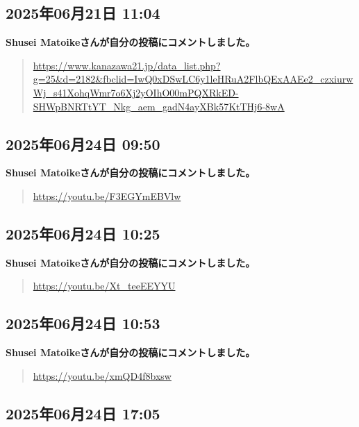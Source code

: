 \subsection*{2025年06月21日 11:04}

\textbf{Shusei Matoikeさんが自分の投稿にコメントしました。}

\begin{quote}
\url{https://www.kanazawa21.jp/data_list.php?g=25&d=2182&fbclid=IwQ0xDSwLC6y1leHRuA2FlbQExAAEe2_czxiurwWj_s41XohqWmr7o6Xj2yOIhO00mPQXRkED-SHWpBNRTtYT_Nkg_aem_gadN4ayXBk57KtTHj6-8wA}
\end{quote}

\subsection*{2025年06月24日 09:50}

\textbf{Shusei Matoikeさんが自分の投稿にコメントしました。}

\begin{quote}
\url{https://youtu.be/F3EGYmEBVlw}
\end{quote}

\subsection*{2025年06月24日 10:25}

\textbf{Shusei Matoikeさんが自分の投稿にコメントしました。}

\begin{quote}
\url{https://youtu.be/Xt_teeEEYYU}
\end{quote}

\subsection*{2025年06月24日 10:53}

\textbf{Shusei Matoikeさんが自分の投稿にコメントしました。}

\begin{quote}
\url{https://youtu.be/xmQD4f8bxsw}
\end{quote}

\subsection*{2025年06月24日 17:05}

